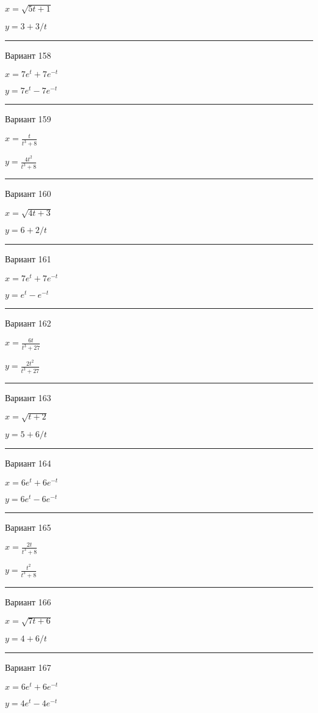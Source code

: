 \documentclass[11pt]{report}
\begin{document}
$x = \sqrt{5 t + 1}$

$y = 3 + 3 / t$

\rule{\textwidth}{.2mm}

 Вариант 158

$x = 7 e^{t} + 7 e^{- t}$

$y = 7 e^{t} - 7 e^{- t}$

\rule{\textwidth}{.2mm}

 Вариант 159

$x = \frac{t}{t^{3} + 8}$

$y = \frac{4 t^{2}}{t^{3} + 8}$

\rule{\textwidth}{.2mm}

 Вариант 160

$x = \sqrt{4 t + 3}$

$y = 6 + 2 / t$

\rule{\textwidth}{.2mm}

 Вариант 161

$x = 7 e^{t} + 7 e^{- t}$

$y = e^{t} - e^{- t}$

\rule{\textwidth}{.2mm}

 Вариант 162

$x = \frac{6 t}{t^{3} + 27}$

$y = \frac{2 t^{2}}{t^{3} + 27}$

\rule{\textwidth}{.2mm}

 Вариант 163

$x = \sqrt{t + 2}$

$y = 5 + 6 / t$

\rule{\textwidth}{.2mm}

 Вариант 164

$x = 6 e^{t} + 6 e^{- t}$

$y = 6 e^{t} - 6 e^{- t}$

\rule{\textwidth}{.2mm}

 Вариант 165

$x = \frac{2 t}{t^{3} + 8}$

$y = \frac{t^{2}}{t^{3} + 8}$

\rule{\textwidth}{.2mm}

 Вариант 166

$x = \sqrt{7 t + 6}$

$y = 4 + 6 / t$

\rule{\textwidth}{.2mm}

 Вариант 167

$x = 6 e^{t} + 6 e^{- t}$

$y = 4 e^{t} - 4 e^{- t}$
\end{document}
